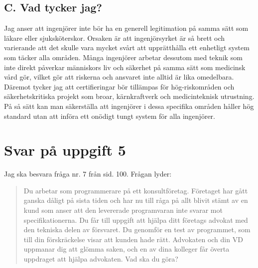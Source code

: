 \documentclass[a4paper,12pt]{article}
\begin{document}
\subsection*{C. Vad tycker jag?}
Jag anser att ingenjörer inte bör ha en generell legitimation på samma sätt som
läkare eller sjuksköterskor. Orsaken är att ingenjörsyrket är så brett och
varierande att det skulle vara mycket svårt att upprätthålla ett enhetligt
system som täcker alla områden. Många ingenjörer arbetar dessutom med teknik
som inte direkt påverkar människors liv och säkerhet på samma sätt som
medicinsk vård gör, vilket gör att riskerna och ansvaret inte alltid är lika
omedelbara.
%
Däremot tycker jag att certifieringar bör tillämpas för hög-riskområden och
säkerhetskritiska projekt som broar, kärnkraftverk och medicinteknisk
utrustning. På så sätt kan man säkerställa att ingenjörer i dessa specifika
områden håller hög standard utan att införa ett onödigt tungt system för alla
ingenjörer.
%
\section*{Svar på uppgift 5}
Jag ska besvara fråga nr. 7 från \cite{komp} sid. 100. Frågan lyder:
\begin{quote}
    Du arbetar som programmerare på ett konsultföretag. Företaget har gått
    ganska dåligt på sista tiden och har nu till råga på allt blivit stämt av
    en kund som anser att den levererade programvaran inte svarar mot
    speciﬁkationerna. Du får till uppgift att hjälpa ditt företags advokat med
    den tekniska delen av försvaret. Du genomför en test av programmet, som
    till din förskräckelse visar att kunden hade rätt. Advokaten och din VD
    uppmanar dig att glömma saken, och en av dina kolleger får överta uppdraget
    att hjälpa advokaten. Vad ska du göra?
\end{quote}
%
\end{document}
